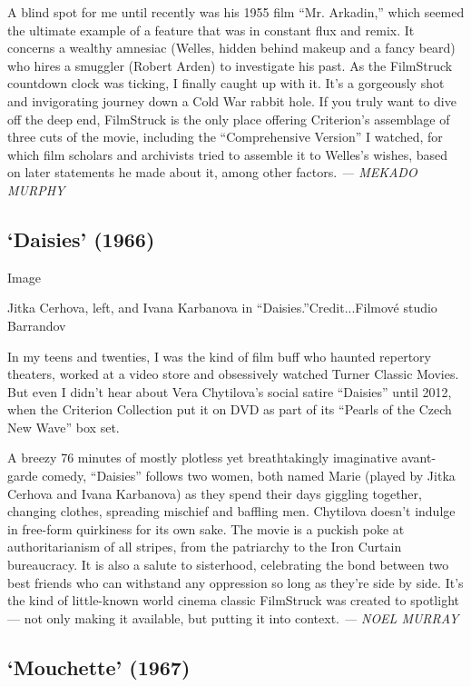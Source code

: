 A blind spot for me until recently was his 1955 film ``Mr. Arkadin,''
which seemed the ultimate example of a feature that was in constant flux
and remix. It concerns a wealthy amnesiac (Welles, hidden behind makeup
and a fancy beard) who hires a smuggler (Robert Arden) to investigate
his past. As the FilmStruck countdown clock was ticking, I finally
caught up with it. It's a gorgeously shot and invigorating journey down
a Cold War rabbit hole. If you truly want to dive off the deep end,
FilmStruck is the only place offering Criterion's assemblage of three
cuts of the movie, including the ``Comprehensive Version'' I watched,
for which film scholars and archivists tried to assemble it to Welles's
wishes, based on later statements he made about it, among other factors.
\emph{--- MEKADO MURPHY}

\hypertarget{daisies-1966}{%
\subsection{`Daisies' (1966)}\label{daisies-1966}}

Image

Jitka Cerhova, left, and Ivana Karbanova in ``Daisies.''Credit...Filmové
studio Barrandov

In my teens and twenties, I was the kind of film buff who haunted
repertory theaters, worked at a video store and obsessively watched
Turner Classic Movies. But even I didn't hear about Vera Chytilova's
social satire ``Daisies'' until 2012, when the Criterion Collection put
it on DVD as part of its ``Pearls of the Czech New Wave'' box set.

A breezy 76 minutes of mostly plotless yet breathtakingly imaginative
avant-garde comedy, ``Daisies'' follows two women, both named Marie
(played by Jitka Cerhova and Ivana Karbanova) as they spend their days
giggling together, changing clothes, spreading mischief and baffling
men. Chytilova doesn't indulge in free-form quirkiness for its own sake.
The movie is a puckish poke at authoritarianism of all stripes, from the
patriarchy to the Iron Curtain bureaucracy. It is also a salute to
sisterhood, celebrating the bond between two best friends who can
withstand any oppression so long as they're side by side. It's the kind
of little-known world cinema classic FilmStruck was created to spotlight
--- not only making it available, but putting it into context. \emph{---
NOEL MURRAY}

\hypertarget{mouchette-1967}{%
\subsection{`Mouchette' (1967)}\label{mouchette-1967}}

